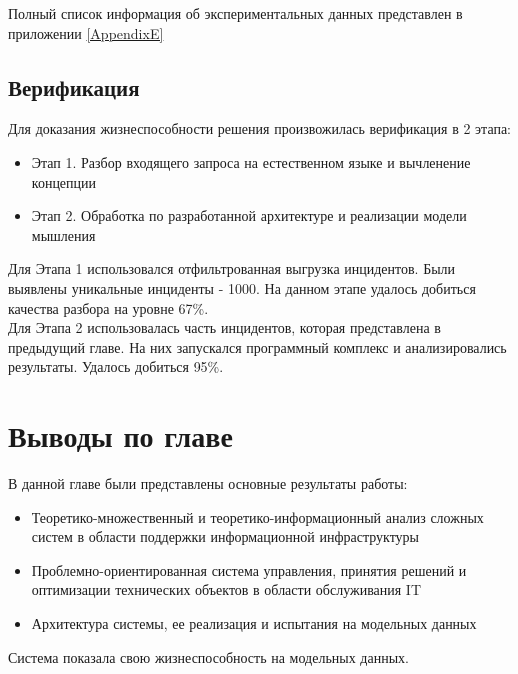Полный список информация об экспериментальных данных представлен в приложении \ref{AppendixE}
\clearpage
\subsection{Верификация}
Для доказания жизнеспособности решения произвожилась верификация в 2 этапа:
\begin{itemize}
	\item Этап 1. Разбор входящего запроса на естественном языке и вычленение концепции
	\item Этап 2. Обработка по разработанной архитектуре и реализации модели мышления  
\end{itemize}
Для Этапа 1 использовался отфильтрованная выгрузка инцидентов. Были выявлены уникальные инциденты - 1000. На данном этапе удалось добиться качества разбора на уровне 67\%. \\
Для Этапа 2 использовалась часть инцидентов, которая представлена в предыдущий главе. На них запускался программный комплекс и анализировались результаты. Удалось добиться 95\%. \\
\section{Выводы по главе}
В данной главе были представлены основные результаты работы:
\begin{itemize}
	\item Теоретико-множественный и теоретико-информационный анализ сложных систем в области поддержки информационной инфраструктуры
	\item Проблемно-ориентированная система управления, принятия решений и оптимизации технических объектов в области обслуживания IT
	\item Архитектура системы, ее реализация и испытания на модельных данных
\end{itemize}
Система показала свою жизнеспособность на модельных данных. 


\clearpage